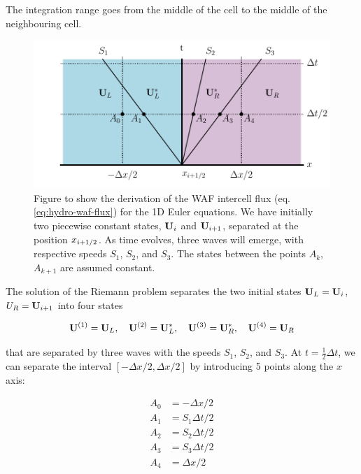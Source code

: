 The integration range goes from the middle of the cell to the middle of the neighbouring cell.





\begin{figure}[htbp]
	\includegraphics[width=\textwidth]{./figures/WAF-hydro.pdf}%
	\caption{Figure to show the derivation of the WAF intercell flux (eq. \ref{eq:hydro-waf-flux}) for the 1D Euler equations.
		We have initially two piecewise constant states, $\mathbf{U}_i$ and $\mathbf{U}_{i+1}$, separated at the position $x_{i+1/2}$.
		As time evolves, three waves will emerge, with respective speeds $S_1$, $S_2$, and $S_3$.
		The states between the points $A_k$, $A_{k+1}$ are assumed constant.
		\label{fig:hydro-waf}
	}
\end{figure}



The solution of the Riemann problem separates the two initial states $\mathbf{U}_L = \mathbf{U}_i$, $U_R = \mathbf{U}_{i+1}$ into four states

\begin{align*}
	\mathbf{U}^{(1)} = \mathbf{U}_L, \quad	\mathbf{U}^{(2)} = \mathbf{U}_L^*, \quad	\mathbf{U}^{(3)} = \mathbf{U}_R^*, \quad	\mathbf{U}^{(4)} = \mathbf{U}_R
\end{align*}

that are separated by three waves with the speeds $S_1$, $S_2$, and $S_3$.
At $t = \frac{1}{2} \Delta t$, we can separate the interval $[-\Delta x /2, \Delta x /2]$ by introducing 5 points along the $x$ axis:

\begin{align*}
	A_0 &= - \Delta x / 2\\
	A_1 &= S_1 \Delta t / 2\\
	A_2 &= S_2 \Delta t / 2\\
	A_3 &= S_3 \Delta t / 2\\
	A_4 &= \Delta x / 2
\end{align*}

